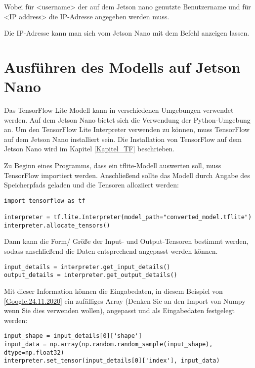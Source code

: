 Wobei für <username> der auf dem Jetson nano genutzte Benutzername und für <IP address> die IP-Adresse angegeben werden muss.

Die IP-Adresse kann man sich vom Jetson Nano mit dem Befehl
anzeigen lassen.

\section{Ausführen des Modells auf Jetson Nano}
Das TensorFlow Lite Modell kann in verschiedenen Umgebungen verwendet werden. Auf dem Jetson Nano bietet sich die Verwendung der Python-Umgebung an.
Um den TensorFlow Lite Interpreter verwenden zu können, muss TensorFlow auf dem Jetson Nano installiert sein.
Die Installation von TensorFlow auf dem Jetson Nano wird im Kapitel \ref{Kapitel_TF} beschrieben.

Zu Beginn eines Programms, dass ein tflite-Modell auswerten soll, muss TensorFlow importiert werden. Anschließend sollte das Modell durch Angabe des
Speicherpfads geladen und die Tensoren alloziiert werden:

\begin{lstlisting}[frame=none, numbers=none]
import tensorflow as tf

interpreter = tf.lite.Interpreter(model_path="converted_model.tflite")
interpreter.allocate_tensors()
\end{lstlisting}

Dann kann die Form/ Größe der Input- und Output-Tensoren bestimmt werden, sodass anschließend die Daten entsprechend angepasst werden können.
\begin{lstlisting}[frame=none, numbers=none]
input_details = interpreter.get_input_details()
output_details = interpreter.get_output_details()
\end{lstlisting}

Mit dieser Information können die Eingabedaten, in diesem Beispiel von \ref{Google.24.11.2020} ein zufälliges Array (Denken Sie an den Import von Numpy wenn
Sie dies verwenden wollen), angepasst und als Eingabedaten festgelegt werden:
\begin{lstlisting}[frame=none, numbers=none]
input_shape = input_details[0]['shape']
input_data = np.array(np.random.random_sample(input_shape), dtype=np.float32)
interpreter.set_tensor(input_details[0]['index'], input_data)
\end{lstlisting}


